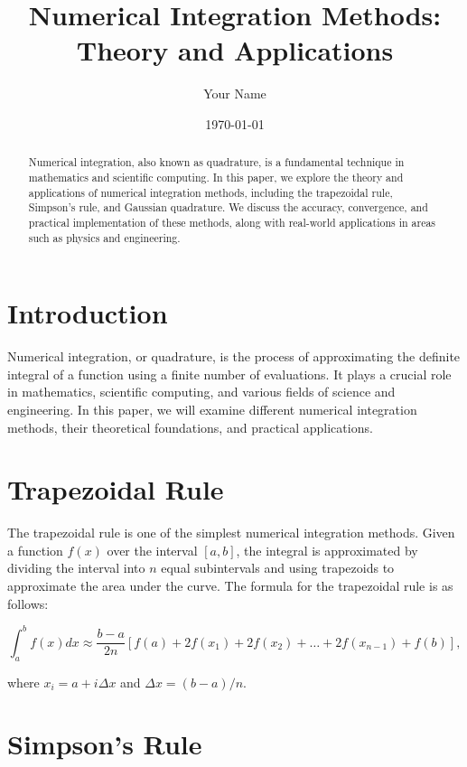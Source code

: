 \documentclass{article}
\title{Numerical Integration Methods: Theory and Applications}
\author{Your Name}
\date{\today}
\begin{document}
\maketitle

\begin{abstract}
Numerical integration, also known as quadrature, is a fundamental technique in mathematics and scientific computing. In this paper, we explore the theory and applications of numerical integration methods, including the trapezoidal rule, Simpson's rule, and Gaussian quadrature. We discuss the accuracy, convergence, and practical implementation of these methods, along with real-world applications in areas such as physics and engineering.
\end{abstract}

\section{Introduction}

Numerical integration, or quadrature, is the process of approximating the definite integral of a function using a finite number of evaluations. It plays a crucial role in mathematics, scientific computing, and various fields of science and engineering. In this paper, we will examine different numerical integration methods, their theoretical foundations, and practical applications.

\section{Trapezoidal Rule}

The trapezoidal rule is one of the simplest numerical integration methods. Given a function $f(x)$ over the interval $[a, b]$, the integral is approximated by dividing the interval into $n$ equal subintervals and using trapezoids to approximate the area under the curve. The formula for the trapezoidal rule is as follows:

\begin{equation}
\int_{a}^{b} f(x) dx \approx \frac{b - a}{2n} \left[f(a) + 2f(x_1) + 2f(x_2) + \ldots + 2f(x_{n-1}) + f(b)\right],
\end{equation}

where $x_i = a + i\Delta x$ and $\Delta x = (b - a)/n$.

\section{Simpson's Rule}
\end{document}

